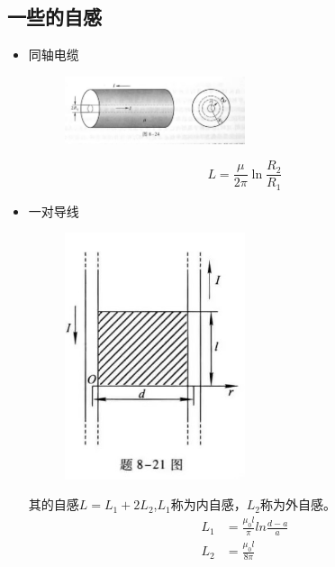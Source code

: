 \documentclass{ctexart}
\begin{document}
\subsection{一些的自感}
\begin{itemize}
    \item 同轴电缆
    \begin{figure}[H]
        \centering
        \includegraphics[width=0.5\textwidth]{img/8-24.jpg}
    \end{figure}
    $$
        L = \frac{\mu}{2\pi} \ln \frac{R_2}{R_1}
    $$
    \item 一对导线
    \begin{figure}[H]
        \centering
        \includegraphics[width=0.5\textwidth]{img/8-21.jpg}
    \end{figure}
    其的自感$L = L_1 +2L_2$,$L_1$称为内自感，$L_2$称为外自感。
    \begin{align*}
        L_1 &= \frac{\mu_0l}{\pi} ln \frac{d-a}{a} \\
        L_2 &= \frac{\mu_0 l}{8\pi}
    \end{align*}
\end{itemize}
\end{document}
